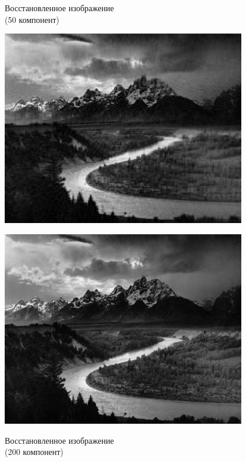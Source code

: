 \documentclass[a4paper]{article}
\begin{document}
\begin{figure}[H]
\centering
    \begin{minipage}{.5\textwidth}
    \caption{Восстановленное изображение \\(50 компонент)}
    \includegraphics[width = 0.95\textwidth]{reconstructions/with_50comps_Adams_The_Tetons_and_the_Snake_River.jpg}
    \label{fig:mount_50}
    \hspace{8 mm}
    \caption{Восстановленное изображение \\(200 компонент)}
    \includegraphics[width = 0.95\textwidth]{reconstructions/with_200comps_Adams_The_Tetons_and_the_Snake_River.jpg}
    \label{fig:mount_200}
    \end{minipage}%

\end{figure}
\end{document}
